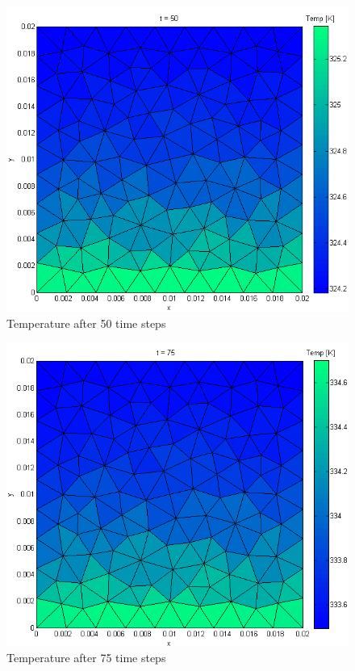 \documentclass[12pt]{article}
\begin{document}
	\begin{figure}[H]
    \includegraphics[scale=0.5]{matlab-results/3.png}
    \centering
    \caption{Temperature after 50 time steps}
	\end{figure}	
	\begin{figure}[H]
    \includegraphics[scale=0.5]{matlab-results/4.png}
    \centering
    \caption{Temperature after 75 time steps}
	\end{figure}	
\end{document}
